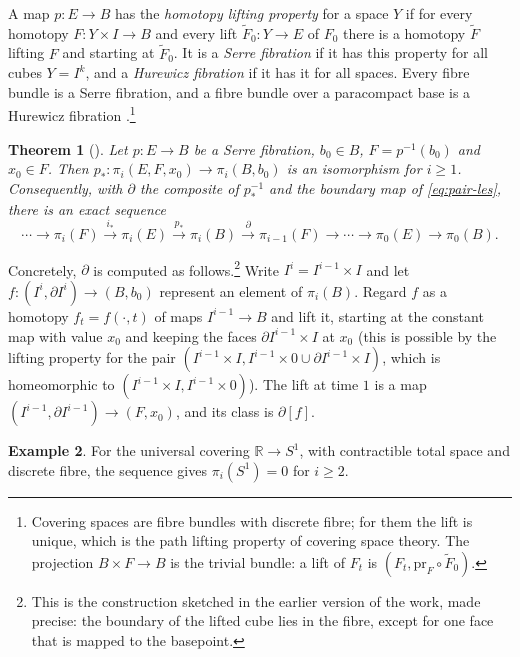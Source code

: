 \documentclass[11pt]{amsart}
\numberwithin{equation}{section}
\theoremstyle{plain}
\newtheorem{theorem}{Theorem}[section]
\theoremstyle{definition}
\newtheorem{example}[theorem]{Example}
\theoremstyle{remark}
\newcommand{\R}{\mathbb{R}}
\begin{document}
A map $p\colon E\to B$ has the \emph{homotopy lifting property} for a space $Y$ if for every homotopy $F\colon Y\times I\to B$ and every lift $\tilde F_0\colon Y\to E$ of $F_0$ there is a homotopy $\tilde F$ lifting $F$ and starting at $\tilde F_0$. It is a \emph{Serre fibration} if it has this property for all cubes $Y=I^k$, and a \emph{Hurewicz fibration} if it has it for all spaces. Every fibre bundle is a Serre fibration, and a fibre bundle over a paracompact base is a Hurewicz fibration \cite[Proposition~4.48 and the remarks after it]{Hat02}.\footnote{Covering spaces are fibre bundles with discrete fibre; for them the lift is unique, which is the path lifting property of covering space theory. The projection $B\times F\to B$ is the trivial bundle: a lift of $F_t$ is $(F_t,\mathrm{pr}_F\circ\tilde F_0)$.}

\begin{theorem}[{\cite[Theorem~4.41]{Hat02}}]\label{thm:les}
Let $p\colon E\to B$ be a Serre fibration, $b_0\in B$, $F=p^{-1}(b_0)$ and $x_0\in F$. Then $p_*\colon\pi_i(E,F,x_0)\to\pi_i(B,b_0)$ is an isomorphism for $i\ge1$. Consequently, with $\partial$ the composite of $p_*^{-1}$ and the boundary map of \eqref{eq:pair-les}, there is an exact sequence
\[
\cdots\to\pi_i(F)\xrightarrow{\ i_*\ }\pi_i(E)\xrightarrow{\ p_*\ }\pi_i(B)\xrightarrow{\ \partial\ }\pi_{i-1}(F)\to\cdots\to\pi_0(E)\to\pi_0(B).
\]
\end{theorem}

Concretely, $\partial$ is computed as follows.\footnote{This is the construction sketched in the earlier version of the work, made precise: the boundary of the lifted cube lies in the fibre, except for one face that is mapped to the basepoint.} Write $I^i=I^{i-1}\times I$ and let $f\colon(I^i,\partial I^i)\to(B,b_0)$ represent an element of $\pi_i(B)$. Regard $f$ as a homotopy $f_t=f(\cdot,t)$ of maps $I^{i-1}\to B$ and lift it, starting at the constant map with value $x_0$ and keeping the faces $\partial I^{i-1}\times I$ at $x_0$ (this is possible by the lifting property for the pair $(I^{i-1}\times I, I^{i-1}\times0\cup\partial I^{i-1}\times I)$, which is homeomorphic to $(I^{i-1}\times I,I^{i-1}\times0)$). The lift at time $1$ is a map $(I^{i-1},\partial I^{i-1})\to(F,x_0)$, and its class is $\partial[f]$.

\begin{example}\label{ex:covering}
For the universal covering $\R\to S^1$, with contractible total space and discrete fibre, the sequence gives $\pi_i(S^1)=0$ for $i\ge2$.
\end{example}
\end{document}

